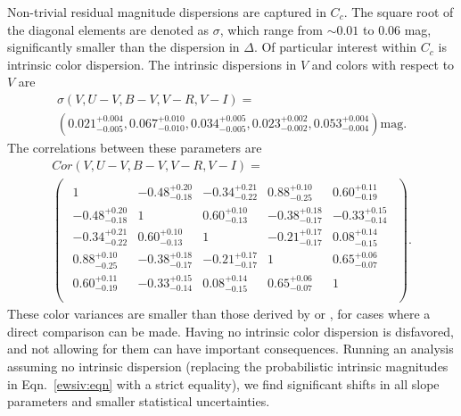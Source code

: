 \documentclass{aastex61}   	%
\begin{document}
Non-trivial residual magnitude dispersions are captured in $C_c$.  The square
root of the diagonal elements are denoted as $\sigma$, which
range from
$\sim 0.01$ to 0.06 mag, significantly smaller
than the dispersion in $\Delta$.
Of particular interest within $C_c$ is intrinsic color dispersion.  The intrinsic dispersions in $V$ and colors with respect to $V$ are
\begin{multline}
\sigma(V,U-V,B-V,V-R,V-I)=\\
\left(
0.021^{+0.004}_{-0.005} ,
0.067^{+0.010}_{-0.010},
0.034^{+0.005}_{-0.005},
0.023^{+0.002}_{-0.002},
0.053^{+0.004}_{-0.004}
\right)
 \text{mag}.
 \label{sig_intrinsic:eqn}
 \end{multline}
The correlations between these parameters are
\begin{multline}
Cor(V,U-V,B-V,V-R,V-I)=\\
\begin{pmatrix}
\begin{array}{rrrrr}
1 & -0.48^{+0.20}_{-0.18} & -0.34^{+0.21}_{-0.22} & 0.88^{+0.10}_{-0.25} & 0.60^{+0.11}_{-0.19} \\
-0.48^{+0.20}_{-0.18} & 1 & 0.60^{+0.10}_{-0.13} & -0.38^{+0.18}_{-0.17} & -0.33^{+0.15}_{-0.14} \\
-0.34^{+0.21}_{-0.22} & 0.60^{+0.10}_{-0.13} & 1 & -0.21^{+0.17}_{-0.17} & 0.08^{+0.14}_{-0.15} \\
0.88^{+0.10}_{-0.25} & -0.38^{+0.18}_{-0.17} & -0.21^{+0.17}_{-0.17} & 1 & 0.65^{+0.06}_{-0.07} \\
0.60^{+0.11}_{-0.19} & -0.33^{+0.15}_{-0.14} & 0.08^{+0.14}_{-0.15} & 0.65^{+0.06}_{-0.07} & 1 \\
\end{array}
 \end{pmatrix}.
 \label{cor_intrinsic:eqn}
 \end{multline}
These color variances are smaller than those derived by \citet{2003A&A...404..901N} or \citet{2007ApJ...659..122J}, for cases where
a direct comparison can be made.
Having no intrinsic color dispersion is disfavored, and not allowing for them can have important consequences.  Running an analysis assuming no intrinsic dispersion (replacing the probabilistic intrinsic magnitudes in Eqn.~\ref{ewsiv:eqn}
with a strict equality), we find significant shifts in all slope parameters  and smaller statistical uncertainties.
\end{document}
